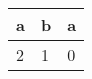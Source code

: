\documentclass{article}[12pt]
\begin{document}
\centering
\begin{tabular}{lll}
a&b&a\\
\hline
2&1&0
\end{tabular}

  
\end{document}
